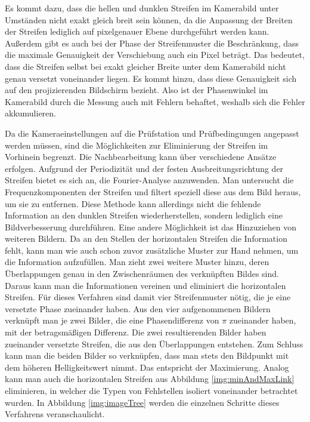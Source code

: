\noindent
Es kommt dazu, dass die hellen und dunklen Streifen im Kamerabild unter Umständen nicht exakt gleich breit sein können, da die Anpassung der Breiten der Streifen lediglich auf pixelgenauer Ebene durchgeführt werden kann.
Außerdem gibt es auch bei der Phase der Streifenmuster die Beschränkung, dass die maximale Genauigkeit der Verschiebung auch ein Pixel beträgt.
Das bedeutet, dass die Streifen selbst bei exakt gleicher Breite unter dem Kamerabild nicht genau versetzt voneinander liegen.
Es kommt hinzu, dass diese Genauigkeit sich auf den projizierenden Bildschirm bezieht.
Also ist der Phasenwinkel im Kamerabild durch die Messung auch mit Fehlern behaftet, weshalb sich die Fehler akkumulieren.

\p
Da die Kameraeinstellungen auf die Prüfstation und Prüfbedingungen angepasst werden müssen, sind die Mög\-lich\-kei\-ten zur Eliminierung der Streifen im Vorhinein begrenzt.
Die Nachbearbeitung kann über verschiedene Ansätze erfolgen.
Aufgrund der Periodizität und der festen Ausbreitungsrichtung der Streifen bietet es sich an, die Fourier-Analyse anzuwenden.
Man untersucht die Frequenzkomponenten der Streifen und filtert speziell diese aus dem Bild heraus, um sie zu entfernen.
Diese Methode kann allerdings nicht die fehlende Information an den dunklen Streifen wiederherstellen, sondern lediglich eine Bildverbesserung durchführen.
Eine andere Mög\-lich\-keit ist das Hinzuziehen von weiteren Bildern.
Da an den Stellen der horizontalen Streifen die Information fehlt, kann man wie auch schon zuvor zusätzliche Muster zur Hand nehmen, um die Information aufzufüllen.
Man zieht zwei weitere Muster hinzu, deren Überlappungen genau in den Zwischenräumen des verknüpften Bildes sind. 
Daraus kann man die Informationen vereinen und eliminiert die horizontalen Streifen.
Für dieses Verfahren sind damit vier Streifenmuster nötig, die je eine versetzte Phase zueinander haben.
Aus den vier aufgenommenen Bildern verknüpft man je zwei Bilder, die eine Phasendifferenz von $ \pi $ zueinander haben, mit der betragsmäßigen Differenz.
Die zwei resultierenden Bilder haben zueinander versetzte Streifen, die aus den Überlappungen entstehen.
Zum Schluss kann man die beiden Bilder so verknüpfen, dass man stets den Bildpunkt mit dem höheren Helligkeitswert nimmt.
Das entspricht der Maximierung.
Analog kann man auch die horizontalen Streifen aus Abbildung \ref{img:minAndMaxLink} eliminieren, in welcher die Typen von Fehlstellen isoliert voneinander betrachtet wurden.
In Abbildung \ref{img:imageTree} werden die einzelnen Schritte dieses Verfahrens veranschaulicht.

